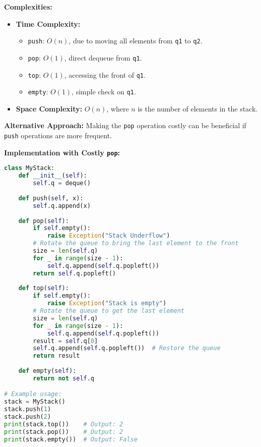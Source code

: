 \textbf{Complexities:}

\begin{itemize}
    \item \textbf{Time Complexity:}
        \begin{itemize}
            \item \texttt{push}: \(O(n)\), due to moving all elements from \texttt{q1} to \texttt{q2}.
            \item \texttt{pop}: \(O(1)\), direct dequeue from \texttt{q1}.
            \item \texttt{top}: \(O(1)\), accessing the front of \texttt{q1}.
            \item \texttt{empty}: \(O(1)\), simple check on \texttt{q1}.
        \end{itemize}
    \item \textbf{Space Complexity:} \(O(n)\), where \(n\) is the number of elements in the stack.
\end{itemize}

\textbf{Alternative Approach:}  
Making the \texttt{pop} operation costly can be beneficial if \texttt{push} operations are more frequent.

\textbf{Implementation with Costly \texttt{pop}:}

\begin{fullwidth}
\begin{lstlisting}[language=Python]
class MyStack:
    def __init__(self):
        self.q = deque()
    
    def push(self, x):
        self.q.append(x)
    
    def pop(self):
        if self.empty():
            raise Exception("Stack Underflow")
        # Rotate the queue to bring the last element to the front
        size = len(self.q)
        for _ in range(size - 1):
            self.q.append(self.q.popleft())
        return self.q.popleft()
    
    def top(self):
        if self.empty():
            raise Exception("Stack is empty")
        # Rotate the queue to get the last element
        size = len(self.q)
        for _ in range(size - 1):
            self.q.append(self.q.popleft())
        result = self.q[0]
        self.q.append(self.q.popleft())  # Restore the queue
        return result
    
    def empty(self):
        return not self.q

# Example usage:
stack = MyStack()
stack.push(1)
stack.push(2)
print(stack.top())    # Output: 2
print(stack.pop())    # Output: 2
print(stack.empty())  # Output: False
\end{lstlisting}
\end{fullwidth}

